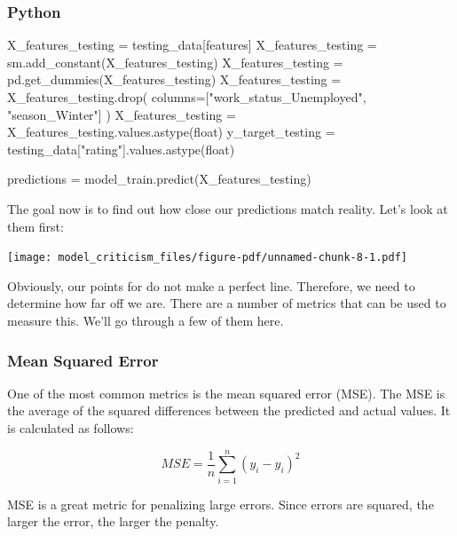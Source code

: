 \documentclass[
  letterpaper,
]{krantz}
\newenvironment{Shaded}{}{}
\newcommand{\BuiltInTok}[1]{\textcolor[rgb]{0.00,0.50,0.00}{#1}}
\newcommand{\NormalTok}[1]{#1}
\newcommand{\OperatorTok}[1]{\textcolor[rgb]{0.40,0.40,0.40}{#1}}
\newcommand{\StringTok}[1]{\textcolor[rgb]{0.25,0.44,0.63}{#1}}
\begin{document}
\subsubsection{Python}

\begin{Shaded}
\begin{Highlighting}[]
\NormalTok{X\_features\_testing }\OperatorTok{=}\NormalTok{ testing\_data[features]}
\NormalTok{X\_features\_testing }\OperatorTok{=}\NormalTok{ sm.add\_constant(X\_features\_testing)}
\NormalTok{X\_features\_testing }\OperatorTok{=}\NormalTok{ pd.get\_dummies(X\_features\_testing)}
\NormalTok{X\_features\_testing }\OperatorTok{=}\NormalTok{ X\_features\_testing.drop(}
\NormalTok{  columns}\OperatorTok{=}\NormalTok{[}\StringTok{"work\_status\_Unemployed"}\NormalTok{, }\StringTok{"season\_Winter"}\NormalTok{]}
\NormalTok{  )}
\NormalTok{X\_features\_testing }\OperatorTok{=}\NormalTok{ X\_features\_testing.values.astype(}\BuiltInTok{float}\NormalTok{)}
\NormalTok{y\_target\_testing }\OperatorTok{=}\NormalTok{ testing\_data[}\StringTok{"rating"}\NormalTok{].values.astype(}\BuiltInTok{float}\NormalTok{)}

\NormalTok{predictions }\OperatorTok{=}\NormalTok{ model\_train.predict(X\_features\_testing)}
\end{Highlighting}
\end{Shaded}

The goal now is to find out how close our predictions match reality.
Let's look at them first:

\texttt{[image: model\_criticism\_files/figure-pdf/unnamed-chunk-8-1.pdf]}

Obviously, our points for do not make a perfect line. Therefore, we need
to determine how far off we are. There are a number of metrics that can
be used to measure this. We'll go through a few of them here.

\subsubsection{Mean Squared Error}\label{mean-squared-error}

One of the most common metrics is the mean squared error (MSE). The MSE
is the average of the squared differences between the predicted and
actual values. It is calculated as follows:

\[MSE = \frac{1}{n}\sum_{i=1}^{n}(y_i - \hat{y}_i)^2\]

MSE is a great metric for penalizing large errors. Since errors are
squared, the larger the error, the larger the penalty.
\end{document}
